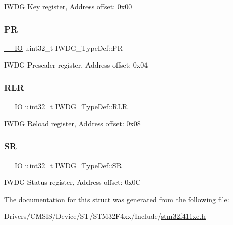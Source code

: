 I\+W\+DG Key register, Address offset\+: 0x00 \mbox{\label{struct_i_w_d_g___type_def_a5f2717885ff171e686e0347af9e6b68d}} 
\subsubsection{\texorpdfstring{PR}{PR}}
{\footnotesize\ttfamily \hyperlink{core__sc300_8h_aec43007d9998a0a0e01faede4133d6be}{\+\_\+\+\_\+\+IO} uint32\+\_\+t I\+W\+D\+G\+\_\+\+Type\+Def\+::\+PR}

I\+W\+DG Prescaler register, Address offset\+: 0x04 \mbox{\label{struct_i_w_d_g___type_def_aa3703eaa40e447dcacc69c0827595532}} 
\subsubsection{\texorpdfstring{R\+LR}{RLR}}
{\footnotesize\ttfamily \hyperlink{core__sc300_8h_aec43007d9998a0a0e01faede4133d6be}{\+\_\+\+\_\+\+IO} uint32\+\_\+t I\+W\+D\+G\+\_\+\+Type\+Def\+::\+R\+LR}

I\+W\+DG Reload register, Address offset\+: 0x08 \mbox{\label{struct_i_w_d_g___type_def_a9bbfbe921f2acfaf58251849bd0a511c}} 
\subsubsection{\texorpdfstring{SR}{SR}}
{\footnotesize\ttfamily \hyperlink{core__sc300_8h_aec43007d9998a0a0e01faede4133d6be}{\+\_\+\+\_\+\+IO} uint32\+\_\+t I\+W\+D\+G\+\_\+\+Type\+Def\+::\+SR}

I\+W\+DG Status register, Address offset\+: 0x0C 

The documentation for this struct was generated from the following file\+:\begin{DoxyCompactItemize}
\item 
Drivers/\+C\+M\+S\+I\+S/\+Device/\+S\+T/\+S\+T\+M32\+F4xx/\+Include/\hyperlink{stm32f411xe_8h}{stm32f411xe.\+h}\end{DoxyCompactItemize}

